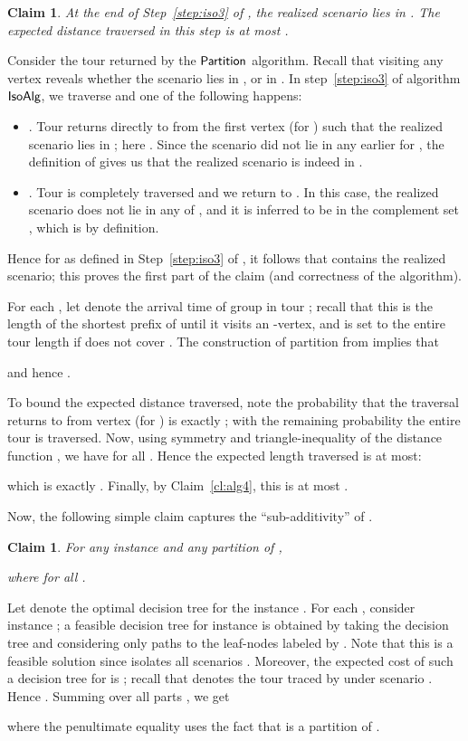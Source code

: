 \documentclass[11pt]{article}
\newtheorem{claim}[thm]{Claim}
\def\iso{\ensuremath{{\sf IsoAlg}}\xspace}
\def\palg{\ensuremath{{\sf Partition}}\xspace}
\newenvironment{pf}{

\noindent{\bf Proof:}} {\hfill


}
\begin{document}
\begin{claim}\label{cl:alg2}
  At the end of Step~\ref{step:iso3} of , the realized scenario lies in . The expected
  distance traversed in this step is at most .
\end{claim}
\begin{pf}
  Consider the tour  returned by
  the \palg algorithm. Recall that visiting any vertex  reveals whether the
  scenario lies in , or in . In step~\ref{step:iso3} of algorithm \iso,
  we traverse  and one of the following happens:
\begin{itemize}
   \item . Tour returns directly to  from the first vertex  (for ) such that the realized scenario lies in ; here . Since the scenario did not lie in any earlier  for , the definition of 
  gives us that the realized scenario is indeed in .
  \item . Tour  is completely traversed and we return to . In this case, the
  realized scenario does not lie in any of , and  it is inferred to be in the complement set ,
  which is  by definition.
\end{itemize}
Hence for  as defined in  Step~\ref{step:iso3} of , it follows that
 contains the realized scenario; this proves the first part of the claim (and correctness of the algorithm).

For each , let  denote the arrival time of group  in tour ; recall that this is the
length of the shortest prefix of  until it visits an -vertex, and is set to the entire tour length if 
does not cover . The construction of partition  from  implies that
  
and hence .

To bound the expected distance traversed, note the probability that  the traversal returns to  from vertex 
(for )  is exactly ; with the remaining  probability the
entire tour  is traversed. Now, using symmetry and triangle-inequality of the distance function , we have  for all . Hence the  expected length traversed is at most:
 
  which is exactly .
Finally, by Claim~\ref{cl:alg4}, this is at most .
\end{pf}



Now, the following simple claim captures the ``sub-additivity'' of .
\begin{claim}\label{cl:alg3}
  For any instance  and any partition   of ,
  
  where  for all .
\end{claim}
\begin{pf}
Let  denote the optimal decision tree for the instance
  . For each ,
  consider instance ; a feasible decision tree for instance 
  is obtained by taking the decision tree  and considering only paths to
  the leaf-nodes labeled by . Note that this is a feasible
  solution since  isolates all scenarios .
  Moreover, the expected cost of such a  decision tree for  is ; recall that  denotes the tour traced
    by  under scenario . Hence .  Summing over all
  parts , we get
  
  where the penultimate equality uses the fact that  is
  a partition of .
\end{pf}
\end{document}
